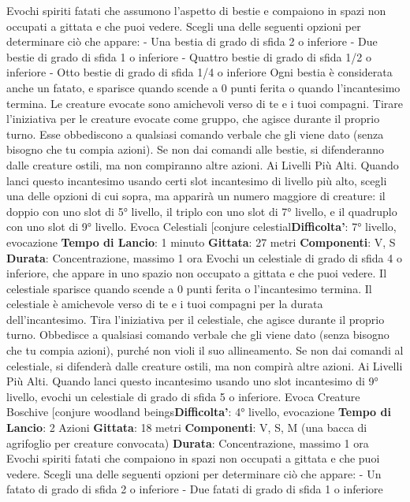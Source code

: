 \begin{multicols}{2}
Evochi spiriti fatati che assumono l’aspetto di bestie e
compaiono in spazi non occupati a gittata e che puoi
vedere. Scegli una delle seguenti opzioni per
determinare ciò che appare:
- Una bestia di grado di sfida 2 o inferiore
- Due bestie di grado di sfida 1 o inferiore
- Quattro bestie di grado di sfida 1/2 o inferiore
- Otto bestie di grado di sfida 1/4 o inferiore
Ogni bestia è considerata anche un fatato, e sparisce
quando scende a 0 punti ferita o quando l’incantesimo
termina.
Le creature evocate sono amichevoli verso di te e i tuoi
compagni. Tirare l’iniziativa per le creature evocate
come gruppo, che agisce durante il proprio turno. Esse
obbediscono a qualsiasi comando verbale che gli viene
dato (senza bisogno che tu compia azioni). Se non dai
comandi alle bestie, si difenderanno dalle creature
ostili, ma non compiranno altre azioni.
Ai Livelli Più Alti. Quando lanci questo incantesimo
usando certi slot incantesimo di livello più alto, scegli
una delle opzioni di cui sopra, ma apparirà un numero
maggiore di creature: il doppio con uno slot di 5° livello,
il triplo con uno slot di 7° livello, e il quadruplo con uno
slot di 9° livello.
Evoca Celestiali
[conjure celestial\textbf{Difficolta'}:
7° livello, evocazione
\textbf{Tempo di Lancio}: 1 minuto
\textbf{Gittata}: 27 metri
\textbf{Componenti}: V, S
\textbf{Durata}: Concentrazione, massimo 1 ora
Evochi un celestiale di grado di sfida 4 o inferiore, che
appare in uno spazio non occupato a gittata e che puoi
vedere. Il celestiale sparisce quando scende a 0 punti
ferita o l’incantesimo termina.
Il celestiale è amichevole verso di te e i tuoi compagni
per la durata dell’incantesimo. Tira l’iniziativa per il
celestiale, che agisce durante il proprio turno.
Obbedisce a qualsiasi comando verbale che gli viene
dato (senza bisogno che tu compia azioni), purché non
violi il suo allineamento. Se non dai comandi al
celestiale, si difenderà dalle creature ostili, ma non
compirà altre azioni.
Ai Livelli Più Alti. Quando lanci questo incantesimo
usando uno slot incantesimo di 9° livello, evochi un
celestiale di grado di sfida 5 o inferiore.
Evoca Creature Boschive
[conjure woodland beings\textbf{Difficolta'}:
4° livello, evocazione
\textbf{Tempo di Lancio}: 2 Azioni
\textbf{Gittata}: 18 metri
\textbf{Componenti}: V, S, M (una bacca di agrifoglio per
creature convocata)
\textbf{Durata}: Concentrazione, massimo 1 ora
Evochi spiriti fatati che compaiono in spazi non occupati
a gittata e che puoi vedere. Scegli una delle seguenti
opzioni per determinare ciò che appare:
- Un fatato di grado di sfida 2 o inferiore
- Due fatati di grado di sfida 1 o inferiore

\end{multicols}
